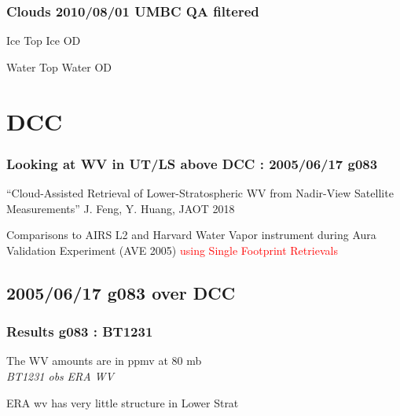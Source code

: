 \documentclass[10pt,t]{beamer}
\begin{document}
\begin{frame}
  \frametitle{Clouds 2010/08/01 UMBC QA filtered}

  Ice Top  \hspace{2.0in} Ice OD\\
  \begin{center}
  \end{center}

  Water Top \hspace{2.0in} Water OD\\
  \begin{center}
  \end{center}

\end{frame}
\section{DCC}
\begin{frame}
  \frametitle{Looking at WV in UT/LS above DCC : 2005/06/17 g083}
  ``Cloud-Assisted Retrieval of Lower-Stratospheric WV from Nadir-View Satellite
    Measurements''  J. Feng, Y. Huang, JAOT 2018

\begin{small}
Comparisons to  AIRS L2 and Harvard Water Vapor instrument during Aura
Validation Experiment (AVE 2005) \textcolor{red}{using Single Footprint Retrievals}
\end{small}


\end{frame}

\subsection{2005/06/17 g083 over DCC}
\begin{frame}
\frametitle{Results g083 : BT1231}
The WV amounts are in ppmv at 80 mb\\
\hspace{0.5in} \emph{BT1231 obs}  \hspace{2.0in} \emph{ERA WV} \\
\begin{center}
\end{center}
ERA wv has very little structure in Lower Strat
\end{frame}
\end{document}

